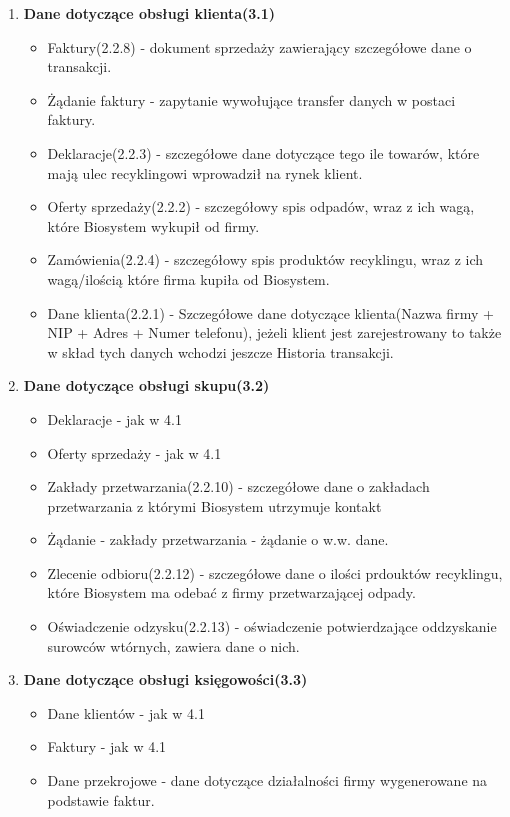 \begin{enumerate}
\item \textbf{Dane dotyczące obsługi klienta(3.1)}
	\begin{itemize}
		\item Faktury(2.2.8) - dokument sprzedaży zawierający szczegółowe dane o transakcji.
		\item Żądanie faktury - zapytanie wywołujące transfer danych w postaci faktury.
		\item Deklaracje(2.2.3) - szczegółowe dane dotyczące tego ile towarów, które mają ulec recyklingowi wprowadził na rynek klient.
		\item Oferty sprzedaży(2.2.2) - szczegółowy spis odpadów, wraz z ich wagą, które Biosystem wykupił od firmy.
		\item Zamówienia(2.2.4) - szczegółowy spis produktów recyklingu, wraz z ich wagą/ilością które firma kupiła od Biosystem.
		\item Dane klienta(2.2.1) - Szczegółowe dane dotyczące klienta(Nazwa firmy + NIP + Adres + Numer telefonu), jeżeli klient jest zarejestrowany to także w skład tych danych wchodzi jeszcze Historia transakcji.
	\end{itemize}
\item \textbf{Dane dotyczące obsługi skupu(3.2)}
	\begin{itemize}
		\item Deklaracje - jak w 4.1
		\item Oferty sprzedaży - jak w 4.1
		\item Zakłady przetwarzania(2.2.10) - szczegółowe dane o zakładach przetwarzania z którymi Biosystem utrzymuje kontakt
		\item Żądanie - zakłady przetwarzania - żądanie o w.w. dane.
		\item Zlecenie odbioru(2.2.12) - szczegółowe dane o ilości prdouktów recyklingu, które Biosystem ma odebać z firmy przetwarzającej odpady.
		\item Oświadczenie odzysku(2.2.13) - oświadczenie potwierdzające oddzyskanie surowców wtórnych, zawiera dane o nich.
	\end{itemize}
\item \textbf{Dane dotyczące obsługi księgowości(3.3)}
	\begin{itemize}
		\item Dane klientów - jak w 4.1
		\item Faktury - jak w 4.1 
		\item Dane przekrojowe - dane dotyczące działalności firmy wygenerowane na podstawie faktur.

\end{itemize}
\end{enumerate}

